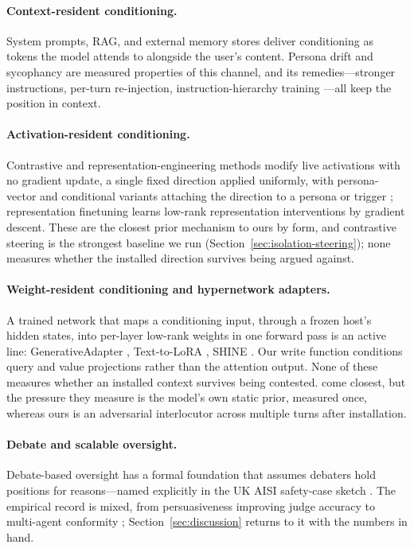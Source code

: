 \paragraph{Context-resident conditioning.} System prompts, RAG, and external memory stores
\citep{packer2023memgpt} deliver conditioning as tokens the model attends to alongside the
user's content. Persona drift \citep{choi2024identitydrift, li2024measuring} and sycophancy
\citep{sharma2024towards, perez2022persona} are measured properties of this channel, and its
remedies---stronger instructions, per-turn re-injection, instruction-hierarchy training
\citep{wallace2024instruction}---all keep the position in context.

\paragraph{Activation-resident conditioning.} Contrastive and representation-engineering
methods \citep{turner2023activation, zou2023representation, rimsky2024caa} modify live
activations with no gradient update, a single fixed direction applied uniformly, with
persona-vector and conditional variants attaching the direction to a persona or trigger
\citep{chen2025personavectors}; representation finetuning \citep{wu2024reft} learns low-rank
representation interventions by gradient descent. These are the closest prior mechanism to
ours by form, and contrastive steering is the strongest baseline we run
(Section~\ref{sec:isolation-steering}); none measures whether the installed direction survives
being argued against.

\paragraph{Weight-resident conditioning and hypernetwork adapters.} A trained network that
maps a conditioning input, through a frozen host's hidden states, into per-layer low-rank
weights in one forward pass is an active line: GenerativeAdapter
\citep{chen2025generativeadapter}, Text-to-LoRA \citep{charakorn2025texttolora}, SHINE
\citep{liu2026shine}. Our write function conditions query and value projections rather than
the attention output. None of these measures whether an installed context survives being
contested. \citet{cheng2026overridegap} come closest, but the pressure they measure is the
model's own static prior, measured once, whereas ours is an adversarial interlocutor across
multiple turns after installation.

\paragraph{Debate and scalable oversight.} Debate-based oversight has a formal foundation
\citep{irving2018debate, browncohen2023doublyefficient} that assumes debaters hold positions
for reasons---named explicitly in the UK AISI safety-case sketch \citep{buhl2025aisi}. The
empirical record is mixed, from persuasiveness improving judge accuracy
\citep{khan2024persuasive} to multi-agent conformity \citep{bertalanic2026costofconsensus};
Section~\ref{sec:discussion} returns to it with the numbers in hand.

